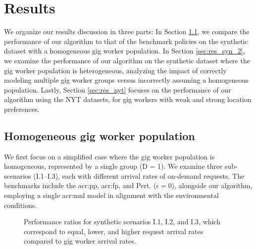 \section{Results}
\label{sec:res}

We organize our results discussion in three parts: In Section \ref{sec:res_syn}, we compare the performance of our algorithm to that of the benchmark policies on the synthetic dataset with a homogeneous gig worker population. In Section \ref{sec:res_syn_2}, we examine the performance of our algorithm on the synthetic dataset where the gig worker population is heterogeneous, analyzing the impact of correctly modeling multiple gig worker groups versus incorrectly assuming a homogeneous population. Lastly, Section \ref{sec:res_nyt} focuses on the performance of our algorithm using the NYT datasets, for gig workers with weak and strong location preferences. 

\subsection{Homogeneous gig worker population}
\label{sec:res_syn}
We first focus on a simplified case where the gig worker population is homogeneous, represented by a single group (D = 1). We examine three sub-scenarios (I.1–I.3), each with different arrival rates of on-demand requests. The benchmarks include the \gls{acr:pp}, \gls{acr:fp}, and Pert. ($\epsilon=0$), alongside our algorithm, employing a single \gls{acr:mnl} model in alignment with the environmental conditions. 

\begin{figure}[t]%
    \centering
    \fontsize{9}{9}\selectfont
    \hspace*{0.1cm} 
    \hspace*{0.1cm}
    \caption{\textnormal{Performance ratios for synthetic scenarios I.1, I.2, and I.3, which correspond to equal, lower, and higher request arrival rates compared to gig worker arrival rates.}}%
    \label{fig:perf_syn}%
\end{figure}

